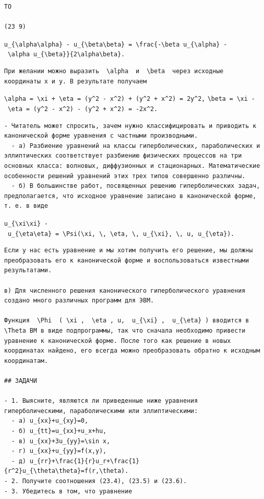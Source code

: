 \documentclass[
  ukrainian,
]{article}
\begin{document}
\begin{verbatim}
TO

(23 9)
\end{verbatim}

\texttt{u\_\{\textbackslash{}alpha\textbackslash{}alpha\}\ -\ u\_\{\textbackslash{}beta\textbackslash{}beta\}\ =\ \textbackslash{}frac\{-\textbackslash{}beta\ u\_\{\textbackslash{}alpha\}\ -\ \textbackslash{}alpha\ u\_\{\textbackslash{}beta\}\}\{2\textbackslash{}alpha\textbackslash{}beta\}.}

\begin{verbatim}
При желании можно выразить  \alpha  и  \beta  через исходные координаты x и y. В результате получаем
\end{verbatim}

\texttt{\textbackslash{}alpha\ =\ \textbackslash{}xi\ +\ \textbackslash{}eta\ =\ (y\^{}2\ -\ x\^{}2)\ +\ (y\^{}2\ +\ x\^{}2)\ =\ 2y\^{}2,}
\texttt{\textbackslash{}beta\ =\ \textbackslash{}xi\ -\ \textbackslash{}eta\ =\ (y\^{}2\ -\ x\^{}2)\ -\ (y\^{}2\ +\ x\^{}2)\ =\ -2x\^{}2.}

\begin{verbatim}
- Читатель может спросить, зачем нужно классифицировать и приводить к канонической форме уравнения с частными производными.
  - а) Разбиение уравнений на классы гиперболических, параболических и эллиптических соответствует разбиению физических процессов на три основных класса: волновых, диффузионных и стационарных. Математические особенности решений уравнений этих трех типов совершенно различны.
  - б) В большинстве работ, посвященных решению гиперболических задач, предполагается, что исходное уравнение записано в канонической форме, т. е. в виде
\end{verbatim}

\texttt{u\_\{\textbackslash{}xi\textbackslash{}xi\}\ -\ u\_\{\textbackslash{}eta\textbackslash{}eta\}\ =\ \textbackslash{}Psi(\textbackslash{}xi,\ \textbackslash{},\ \textbackslash{}eta,\ \textbackslash{},\ u\_\{\textbackslash{}xi\},\ \textbackslash{},\ u,\ u\_\{\textbackslash{}eta\}).}

\begin{verbatim}
Если у нас есть уравнение и мы хотим получить его решение, мы должны преобразовать его к канонической форме и воспользоваться известными результатами.

в) Для численного решения канонического гиперболического уравнения создано много различных программ для ЭВМ.

Функция  \Phi  ( \xi ,  \eta , u,  u_{\xi} ,  u_{\eta} ) вводится в  \Theta ВМ в виде подпрограммы, так что сначала необходимо привести уравнение к канонической форме. После того как решение в новых координатах найдено, его всегда можно преобразовать обратно к исходным координатам.

## ЗАДАЧИ

- 1. Выясните, являются ли приведенные ниже уравнения гиперболическими, параболическими или эллиптическими:
  - a) u_{xx}+u_{xy}=0,
  - б) u_{tt}=u_{xx}+u_x+hu,
  - в) u_{xx}+3u_{yy}=\sin x,
  - г) u_{xx}+u_{yy}=f(x,y),
  - д) u_{rr}+\frac{1}{r}u_r+\frac{1}{r^2}u_{\theta\theta}=f(r,\theta).
- 2. Получите соотношения (23.4), (23.5) и (23.6).
- 3. Убедитесь в том, что уравнение
\end{verbatim}
\end{document}
